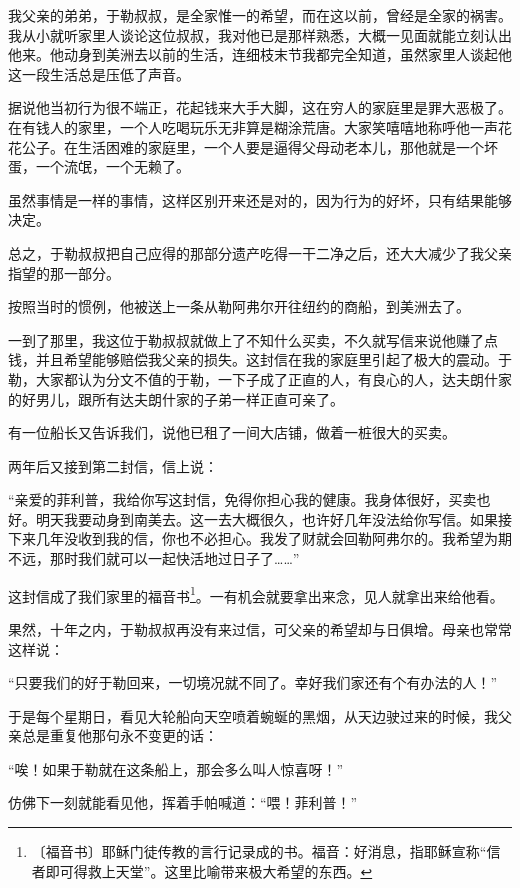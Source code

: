 \documentclass[12pt,UTF-8,openany]{ctexbook}
\begin{document}
\begin{large}
    我父亲的弟弟，于勒叔叔，是全家惟一的希望，而在这以前，曾经是全家的祸害。我从小就听家里人谈论这位叔叔，我对他已是那样熟悉，大概一见面就能立刻认出他来。他动身到美洲去以前的生活，连细枝末节我都完全知道，虽然家里人谈起他这一段生活总是压低了声音。
    
    据说他当初行为很不端正，花起钱来大手大脚，这在穷人的家庭里是罪大恶极了。在有钱人的家里，一个人吃喝玩乐无非算是糊涂荒唐。大家笑嘻嘻地称呼他一声花花公子。在生活困难的家庭里，一个人要是逼得父母动老本儿，那他就是一个坏蛋，一个流氓，一个无赖了。
    
    虽然事情是一样的事情，这样区别开来还是对的，因为行为的好坏，只有结果能够决定。
    
    总之，于勒叔叔把自己应得的那部分遗产吃得一干二净之后，还大大减少了我父亲指望的那一部分。
    
    按照当时的惯例，他被送上一条从勒阿弗尔开往纽约的商船，到美洲去了。
    
    一到了那里，我这位于勒叔叔就做上了不知什么买卖，不久就写信来说他赚了点钱，并且希望能够赔偿我父亲的损失。这封信在我的家庭里引起了极大的震动。于勒，大家都认为分文不值的于勒，一下子成了正直的人，有良心的人，达夫朗什家的好男儿，跟所有达夫朗什家的子弟一样正直可亲了。
    
    有一位船长又告诉我们，说他已租了一间大店铺，做着一桩很大的买卖。
    
    两年后又接到第二封信，信上说：
    
    “亲爱的菲利普，我给你写这封信，免得你担心我的健康。我身体很好，买卖也好。明天我要动身到南美去。这一去大概很久，也许好几年没法给你写信。如果接下来几年没收到我的信，你也不必担心。我发了财就会回勒阿弗尔的。我希望为期不远，那时我们就可以一起快活地过日子了……”
    
    这封信成了我们家里的福音书\footnote{〔福音书〕耶稣门徒传教的言行记录成的书。福音：好消息，指耶稣宣称“信者即可得救上天堂”。这里比喻带来极大希望的东西。}。一有机会就要拿出来念，见人就拿出来给他看。
    
    果然，十年之内，于勒叔叔再没有来过信，可父亲的希望却与日俱增。母亲也常常这样说：
    
    “只要我们的好于勒回来，一切境况就不同了。幸好我们家还有个有办法的人！”
    
    于是每个星期日，看见大轮船向天空喷着蜿蜒的黑烟，从天边驶过来的时候，我父亲总是重复他那句永不变更的话：
    
    “唉！如果于勒就在这条船上，那会多么叫人惊喜呀！”
    
    仿佛下一刻就能看见他，挥着手帕喊道：“喂！菲利普！”
    

\end{large}
\end{document}
